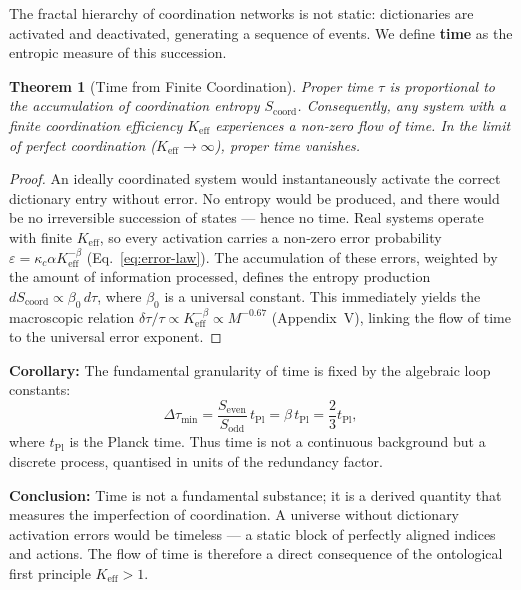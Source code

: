 \documentclass[12pt,a4paper]{article}
\newtheorem{theorem}{Theorem}[section]
\begin{document}
The fractal hierarchy of coordination networks is not static: dictionaries are
activated and deactivated, generating a sequence of events.  We define
\textbf{time} as the entropic measure of this succession.

\begin{theorem}[Time from Finite Coordination]
	\label{thm:time}
	Proper time \(\tau\) is proportional to the accumulation of coordination
	entropy \(S_{\mathrm{coord}}\).  Consequently, any system with a finite
	coordination efficiency \(K_{\mathrm{eff}}\) experiences a non‑zero flow of
	time.  In the limit of perfect coordination (\(K_{\mathrm{eff}} \to \infty\)),
	proper time vanishes.
\end{theorem}

\begin{proof}
	An ideally coordinated system would instantaneously activate the correct
	dictionary entry without error.  No entropy would be produced, and there
	would be no irreversible succession of states — hence no time.  Real systems
	operate with finite \(K_{\mathrm{eff}}\), so every activation carries a
	non‑zero error probability \(\varepsilon = \kappa_c \alpha K_{\mathrm{eff}}^{-\beta}\)
	(Eq.~\ref{eq:error-law}).  The accumulation of these errors, weighted by the
	amount of information processed, defines the entropy production
	\(dS_{\mathrm{coord}} \propto \beta_0 \, d\tau\), where \(\beta_0\) is a
	universal constant.  This immediately yields the macroscopic relation
	\(\delta\tau/\tau \propto K_{\mathrm{eff}}^{-\beta} \propto M^{-0.67}\)
	(Appendix~V), linking the flow of time to the universal error exponent.
\end{proof}

\noindent
\textbf{Corollary:} The fundamental granularity of time is fixed by the algebraic
loop constants:
\[
\Delta \tau_{\min} = \frac{S_{\mathrm{even}}}{S_{\mathrm{odd}}} \, t_{\mathrm{Pl}}
= \beta \, t_{\mathrm{Pl}} = \frac{2}{3} t_{\mathrm{Pl}},
\]
where \(t_{\mathrm{Pl}}\) is the Planck time.  Thus time is not a continuous
background but a discrete process, quantised in units of the redundancy factor.

\noindent
\textbf{Conclusion:} Time is not a fundamental substance; it is a derived
quantity that measures the imperfection of coordination.  A universe without
dictionary activation errors would be timeless — a static block of perfectly
aligned indices and actions.  The flow of time is therefore a direct consequence
of the ontological first principle \(K_{\mathrm{eff}} > 1\).
\end{document}
